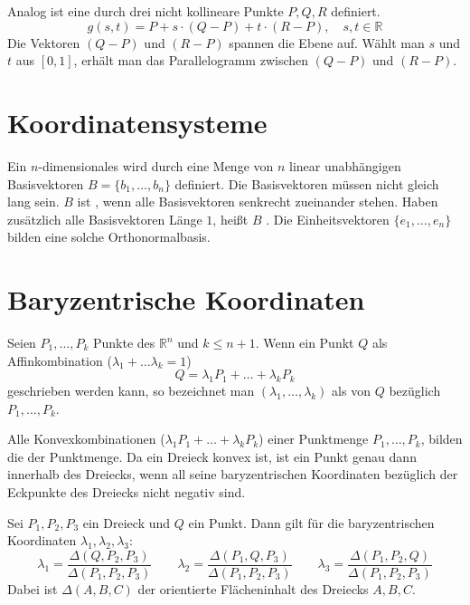 Analog ist eine  durch drei nicht kollineare Punkte $P, Q, R$ definiert.
\[
	g(s, t) = P + s \cdot (Q - P) + t \cdot (R - P), \quad s, t \in \mathbb{R}
\]
Die Vektoren $(Q - P)$ und $(R - P)$ spannen die Ebene auf.
Wählt man $s$ und $t$ aus $[0, 1]$, erhält man das Parallelogramm zwischen $(Q - P)$ und $(R - P)$.

\section{Koordinatensysteme}
Ein $n$-dimensionales  wird durch eine Menge von $n$ linear unabhängigen Basisvektoren $B = \{b_1, \ldots, b_n\}$ definiert.
Die Basisvektoren müssen nicht gleich lang sein.
$B$ ist , wenn alle Basisvektoren senkrecht zueinander stehen.
Haben zusätzlich alle Basisvektoren Länge $1$, heißt $B$ .
Die Einheitsvektoren $\{e_1, \ldots, e_n\}$ bilden eine solche Orthonormalbasis.

\section{Baryzentrische Koordinaten}
\begin{Definition}
	Seien $P_1, \ldots, P_k$ Punkte des $\mathbb{R}^n$ und $k \leq n + 1$.
	Wenn ein Punkt $Q$ als Affinkombination ($\lambda_1 + \ldots \lambda_k = 1$)
	\[
		Q = \lambda_1 P_1 + \ldots + \lambda_k P_k
	\]
	geschrieben werden kann, so bezeichnet man $(\lambda_1, \ldots, \lambda_k)$ als  von $Q$ bezüglich $P_1, \ldots, P_k$.
\end{Definition}

Alle Konvexkombinationen ($\lambda_1 P_1 + \ldots + \lambda_k P_k$) einer Punktmenge $P_1, \ldots, P_k$, bilden die  der Punktmenge. 
Da ein Dreieck konvex ist, ist ein Punkt genau dann innerhalb des Dreiecks, wenn all seine baryzentrischen Koordinaten bezüglich der Eckpunkte des Dreiecks nicht negativ sind.

\begin{Beispiel}
	Sei $P_1, P_2, P_3$ ein Dreieck und $Q$ ein Punkt.
	Dann gilt für die baryzentrischen Koordinaten $\lambda_1, \lambda_2, \lambda_3$:
	\[
		\lambda_1 = \frac{\Delta(Q, P_2, P_3)}{\Delta(P_1, P_2, P_3)} \qquad
		\lambda_2 = \frac{\Delta(P_1, Q, P_3)}{\Delta(P_1, P_2, P_3)} \qquad
		\lambda_3 = \frac{\Delta(P_1, P_2, Q)}{\Delta(P_1, P_2, P_3)}
	\]
	Dabei ist $\Delta(A, B, C)$ der orientierte Flächeninhalt des Dreiecks $A, B, C$.
\end{Beispiel}

